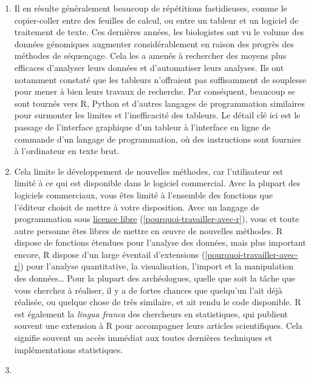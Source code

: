 \documentclass[
  french,
]{scrbook}
\begin{document}
\begin{enumerate}
\def\labelenumi{\arabic{enumi}.}
\item
  Il en résulte généralement beaucoup de répétitions fastidieuses, comme le copier-coller entre des feuilles de calcul, ou entre un tableur et un logiciel de traitement de texte. Ces dernières années, les biologistes ont vu le volume des données génomiques augmenter considérablement en raison des progrès des méthodes de séquençage. Cela les a amenés à rechercher des moyens plus efficaces d'analyser leurs données et d'automatiser leurs analyses. Ils ont notamment constaté que les tableurs n'offraient pas suffisamment de souplesse pour mener à bien leurs travaux de recherche. Par conséquent, beaucoup se sont tournés vers R, Python et d'autres langages de programmation similaires pour surmonter les limites et l'inefficacité des tableurs. Le détail clé ici est le passage de l'interface graphique d'un tableur à l'interface en ligne de commande d'un langage de programmation, où des instructions sont fournies à l'ordinateur en texte brut.
\item
  Cela limite le développement de nouvelles méthodes, car l'utilisateur est limité à ce qui est disponible dans le logiciel commercial. Avec la plupart des logiciels commerciaux, vous êtes limité à l'ensemble des fonctions que l'éditeur choisit de mettre à votre disposition. Avec un langage de programmation sous \href{https://fr.wikipedia.org/wiki/Licence_libre}{licence libre} (\ref{pourquoi-travailler-avec-r}), vous et toute autre personne êtes libres de mettre en œuvre de nouvelles méthodes. R dispose de fonctions étendues pour l'analyse des données, mais plus important encore, R dispose d'un large éventail d'extensions (\ref{pourquoi-travailler-avec-r}) pour l'analyse quantitative, la visualisation, l'import et la manipulation des données\ldots{} Pour la plupart des archéologues, quelle que soit la tâche que vous cherchez à réaliser, il y a de fortes chances que quelqu'un l'ait déjà réalisée, ou quelque chose de très similaire, et ait rendu le code disponible. R est également la \emph{lingua franca} des chercheurs en statistiques, qui publient souvent une extension à R pour accompagner leurs articles scientifiques. Cela signifie souvent un accès immédiat aux toutes dernières techniques et implémentations statistiques.
\item

\end{enumerate}
\end{document}
